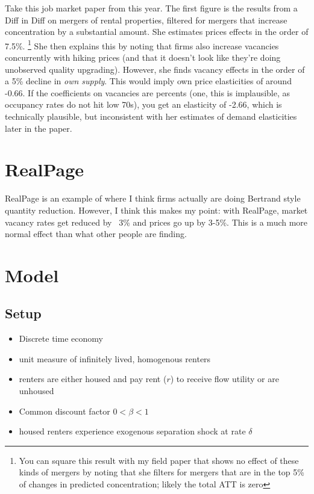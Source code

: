 \documentclass{article}
\begin{document}
Take this job market paper from this year. The first figure is the results from a Diff in Diff on mergers of rental properties, filtered for mergers that increase concentration by a substantial amount. She estimates prices effects in the order of 7.5\%. \footnote{You can square this result with my field paper that shows no effect of these kinds of mergers by noting that she filters for mergers that are in the top 5\% of changes in predicted concentration; likely the total ATT is zero} She then explains this by noting that firms also increase vacancies concurrently with hiking prices (and that it doesn't look like they're doing unobserved quality upgrading). However, she finds vacancy effects in the order of a 5\% decline in \textit{own supply}. This would imply own price elasticities of around -0.66. If the coefficients on vacancies are percents (one, this is implausible, as occupancy rates do not hit low 70s), you get an elasticity of -2.66, which is technically plausible, but inconsistent with her estimates of demand elasticities later in the paper. 


\section{RealPage}
RealPage is an example of where I think firms actually are doing Bertrand style quantity reduction. However, I think this makes my point: with RealPage, market vacancy rates get reduced by ~3\% and prices go up by 3-5\%. This is a much more normal effect than what other people are finding.


\section{Model}

\subsection{Setup}

\begin{itemize}
    \item Discrete time economy
    \item unit measure of infinitely lived, homogenous renters
    \item renters are either housed and pay rent ($r$) to receive flow utility or are unhoused
    \item Common discount factor $0 < \beta < 1$
    \item housed renters experience exogenous separation shock at rate $\delta$
\end{itemize}
\end{document}
